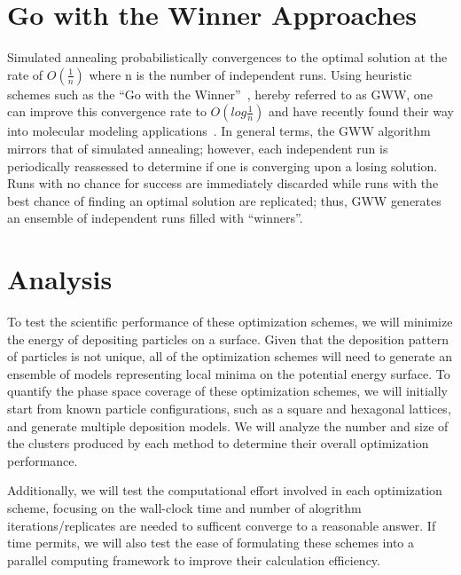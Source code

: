 \documentclass[12pt,onecolumn,notitlepage]{article}
\begin{document}
\section{Go with the Winner Approaches}
Simulated annealing probabilistically convergences to the optimal solution at the rate
 of $O(\frac{1}{n})$ where n is the number of independent runs.  
Using heuristic schemes such as the ``Go with the Winner''~\cite{Aldous1994gwt}, hereby referred to as GWW, 
one can improve this convergence rate to $O(log \frac{1}{n})$ and have recently found their way into molecular modeling applications~\cite{Peinado1997gwt}.  In general terms, the GWW algorithm mirrors that of simulated annealing; however, each independent run is periodically reassessed to determine if one is converging upon a losing solution.  Runs with 
no chance for success are immediately discarded while runs with the best chance of finding an optimal solution
are replicated; thus, GWW generates an ensemble of independent runs filled with  ``winners''.  

\section{Analysis}
To test the scientific performance of these optimization schemes, we will minimize the energy of depositing particles on a surface.  Given that the deposition pattern of particles is not unique, all of the optimization schemes will need to generate an ensemble of models representing local minima on the potential energy surface.  To quantify the phase space coverage of these optimization schemes, we will initially start from known particle configurations, such as a square and hexagonal lattices, and generate multiple deposition models.  We will analyze the number and size of the clusters produced by each method to determine their overall optimization performance.  

Additionally, we will test the computational effort involved in each optimization scheme, focusing on the wall-clock time and number of alogrithm iterations/replicates are needed to sufficent converge to a reasonable answer.  If time permits, we will also test the ease of formulating these schemes into a parallel computing framework to improve their calculation efficiency.



\end{document}
